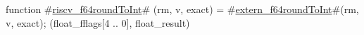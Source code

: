 function #\hyperref[sailRISCVzriscvzyf64roundToInt]{riscv\_f64roundToInt}# (rm, v, exact) = {
  #\hyperref[sailRISCVzexternzyf64roundToInt]{extern\_f64roundToInt}#(rm, v, exact);
  (float_fflags[4 .. 0], float_result)
}
